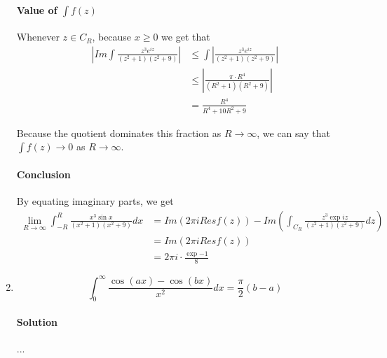 \documentclass[11pt]{article}
\begin{document}
\begin{enumerate}
	\paragraph{Value of $\int f(z)$}
	Whenever $z \in C_R$, because $x \geq 0$ we get that
	\[\begin{aligned}
	| Im \int \frac{z^3e^{iz}}{(z^2 + 1)(z^2 + 9)} | 
	&\leq \int | \frac{z^3e^{iz}}{(z^2 + 1)(z^2 + 9)} | \\
	&\leq | \frac{\pi \cdot R^4}{(R^2 + 1)(R^2 + 9)} | \\
	&= \frac{R^4}{R^4 + 10R^2 + 9}
	\end{aligned}\]
	
	Because the quotient dominates this fraction as $R \rightarrow \infty$, we can say that $\int f(z) \rightarrow 0$ as $R \rightarrow \infty$.
	
	\paragraph{Conclusion}
	By equating imaginary parts, we get 
	\[\begin{aligned}
	\lim_{R\rightarrow \infty} \int^R_{-R} \frac{x^3 \sin{x}}{(x^2 + 1)(x^2 + 9)} dx
	&= Im(2\pi i Res f(z)) - Im (\int_{C_R} \frac{z^3 \exp{iz}}{(z^2 + 1)(z^2 + 9)} dz) \\
	&= Im(2\pi i Res f(z)) \\
	&= 2\pi i \cdot \frac{\exp{-1}}{8}
	\end{aligned} \]
	
	\item \[\int^{\infty}_0 \frac{\cos{(ax)} - \cos{(bx)}}{x^2} dx = \frac{\pi}{2}(b - a) \]
	
	\paragraph{Solution} ...
\end{enumerate}
\end{document}
